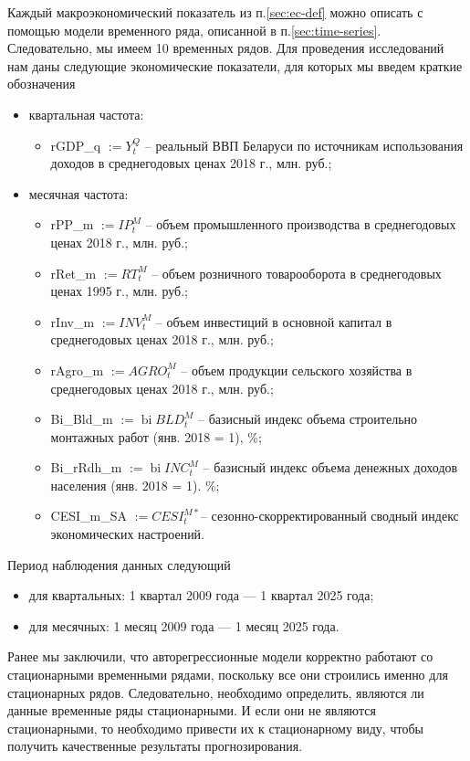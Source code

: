 \documentclass[a4paper, 14pt]{extreport}
\numberwithin{equation}{section}
\newcommand{\bi}{\operatorname{bi}}
\numberwithin{equation}{section}
\begin{document}
	Каждый макроэкономический показатель из п.\ref{sec:ec-def} можно описать с помощью модели временного ряда, описанной в п.\ref{sec:time-series}. Следовательно, мы имеем 10 временных рядов.	Для проведения исследований нам даны следующие экономические показатели, для которых мы введем краткие обозначения
	\begin{itemize}
		\item квартальная частота:
		\begin{itemize}
			\item rGDP\_q $:= Y_t^Q$ -- реальный ВВП Беларуси по источникам использования доходов в среднегодовых ценах 2018 г., млн. руб.;
		\end{itemize}
		\item месячная частота:
	\begin{itemize}
		\item rPP\_m $:= IP_t^M$ -- объем промышленного производства в среднегодовых ценах 2018 г., млн. руб.;
		\item rRet\_m $:= RT_t^M$ -- объем розничного товарооборота в среднегодовых ценах 1995 г., млн. руб.;
		\item rInv\_m $:=INV_t^M$ -- объем инвестиций в основной капитал в среднегодовых ценах 2018 г., млн. руб.;
		\item rAgro\_m $:=AGRO_t^M$ -- объем продукции сельского хозяйства в среднегодовых ценах 2018 г., млн. руб.;
		\item Bi\_Bld\_m $:=\bi BLD_t^M$ -- базисный индекс объема строительно монтажных работ (янв. 2018 = 1), \%;
		\item Bi\_rRdh\_m $:=\bi INC_t^M$ -- базисный индекс объема денежных доходов населения (янв. 2018 = 1). \%;
		\item CESI\_m\_SA $:=CESI_t^{M*}$-- сезонно-скорректированный сводный индекс экономических настроений.
	\end{itemize}
	\end{itemize}
	
	Период наблюдения данных следующий
	\begin{itemize}
		\item для квартальных: 1 квартал 2009 года — 1 квартал 2025 года;
		\item для месячных: 1 месяц 2009 года — 1 месяц 2025 года.
	\end{itemize}
	
	Ранее мы заключили, что авторегрессионные модели корректно работают со стационарными временными рядами, поскольку все они строились именно для стационарных рядов. Следовательно, необходимо определить, являются ли данные временные ряды стационарными. И если они не являются стационарными, то необходимо привести их к стационарному виду, чтобы получить качественные результаты прогнозирования.
	
\end{document}
